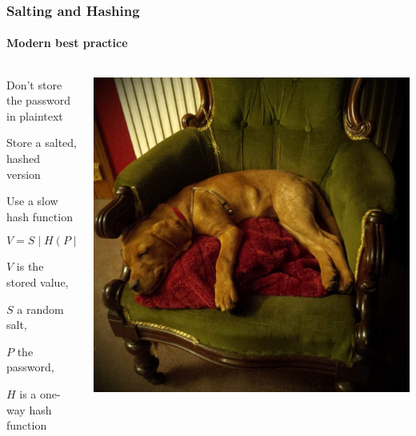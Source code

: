 \documentclass[handout, notes=hide]{beamer}
\def\concat{\mathbin{|}}
\begin{document}

\begin{frame}
\frametitle{Salting and Hashing}
\framesubtitle{Modern best practice}
\setlength{\parskip}{0.55em}

\begin{columns}[T]
\begin{column}[T]{0.5\textwidth}
\setlength{\parskip}{0.5em}

Don't store the password in plaintext

Store a salted, hashed version

Use a slow hash function

$$
V = S \concat H(P \concat S)
$$

$V$ is the stored value,

$S$ a random salt,

$P$ the password,

$H$ is a one-way hash function

\end{column}
\begin{column}[T]{0.45\textwidth}
\includegraphics[width=1.0\textwidth]{boris}
\end{column}
\end{columns}


\end{frame}
\end{document}
